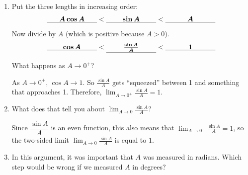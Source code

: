 \documentclass[main]{subfiles}
\begin{document}
\begin{enumerate}
\begin{enumerate}[resume]
\begin{solution}
      In the second picture, the orange arc has radius 1 and is subtended by $A$, so its length is $A$.

      In the third picture, the blue arc has radius $\cos A$ and is subtended by $A$, so its length is
      $A\cos A$.
      \end{solution}

      \pspace{0.5in}

  \item


    Put the three lengths in increasing order:
    \[ \cfitb{1in}{{A \cos A}} 
    < \cfitb{1in}{{ \sin A}}
    < \cfitb{1in}{{ A}} \]
    Now divide by $A$ (which is positive because $A > 0$).
    \[ \cfitb[\vphantom{\frac{a}{b}}]{1in}{\cos A } 
    < \cfitb[\vphantom{\frac{a}{b}}]{1in}{\frac{\sin A}{A}} 
    < \cfitb[\vphantom{\frac{a}{b}}]{1in}{1}
    \]

    What happens as $A \to 0^+$?

    \begin{solution}
      As $A\to 0^+$, ${\cos A} \to 1$. So $\frac{\sin
        A}{A}$ gets ``squeezed'' between 1 and something that approaches
      1. Therefore, $\displaystyle \lim_{A\to 0^+}\frac{\sin A}{A} = 1$.
    \end{solution}

    \pspace{0.5in}

  \item


    \begin{problem}[0.5in]
      What does that tell you about $\displaystyle
      \lim_{A \to 0} \frac{\sin A}{A}$?
    \end{problem}

    \begin{solution}
      Since $\dfrac{\sin A}{A}$ is an even
      function, this also means that $\displaystyle \lim_{A \to 0^-}
      \frac{\sin A}{A} = 1$, so the two-sided limit $\displaystyle \lim_{A
        \to 0} \frac{\sin A}{A}$ is equal to $\boxed{1}$.
    \end{solution}

  \item
    \begin{problem}[0.5in]
      In this argument, it was important that $A$ was measured in
      radians.  Which step would be wrong if we measured $A$ in degrees? 
    \end{problem}


\end{enumerate}
\end{enumerate}
\end{document}
